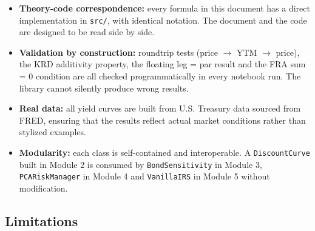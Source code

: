 \documentclass{article}
\theoremstyle{definition}  %
\theoremstyle{plain}  %
\numberwithin{definition}{section}
\numberwithin{proposition}{section}
\numberwithin{theorem}{section}
\numberwithin{equation}{section}
\begin{document}
\begin{itemize}
    \item \textbf{Theory-code correspondence:} every formula in this document has a direct implementation in \texttt{src/}, with identical notation. The document and the code are designed to be read side by side.
    
    \item \textbf{Validation by construction:} roundtrip tests (price $\to$ YTM $\to$ price), the KRD additivity property, the floating leg = par result and the FRA sum = 0 condition are all checked programmatically in every notebook run. The library cannot silently produce wrong results.
    
    \item \textbf{Real data:} all yield curves are built from U.S. Treasury data sourced from FRED, ensuring that the results reflect actual market conditions rather than stylized examples.
    
    \item \textbf{Modularity:} each class is self-contained and interoperable. A \color{codegreen} \texttt{DiscountCurve} \color{black} built in Module 2 is consumed by \color{codegreen} \texttt{BondSensitivity} \color{black} in Module 3, \color{codegreen} \texttt{PCARiskManager} \color{black} in Module 4 and \color{codegreen} \texttt{VanillaIRS} \color{black} in Module 5 without modification.
\end{itemize}

\subsection*{Limitations}
\end{document}

